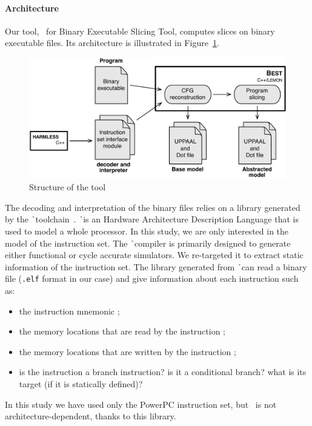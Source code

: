   \paragraph*{Architecture}{
    Our tool, \best\ for Binary Executable Slicing Tool, computes slices on
    binary executable files. 
    Its architecture is illustrated in Figure~\ref{fig:implem}.
    
  \begin{figure}[ht]
    \centering
    \includegraphics[scale=.5]{fig/workflow.pdf}
    \caption{Structure of the tool}
    \label{fig:implem}
  \end{figure}

    The decoding and interpretation of the binary files relies on a library
    generated by the \h\ toolchain~\cite{KBB12}. \h\ is an Hardware Architecture
    Description Language that is used to model a whole processor. In this study,
    we are only interested in the model of the instruction set. The \h\ compiler
    is primarily designed to generate either functional or cycle accurate
    simulators. We re-targeted it to extract static information of the
    instruction set. The library generated from \h\ can read a binary file
    (\texttt{.elf} format in our case) and give information about each
    instruction such as:
    \begin{itemize}
      \item the instruction mnemonic ;
      \item the memory locations that are read by the instruction ;
      \item the memory locations that are written by the instruction ;
      \item is the instruction a branch instruction? is it a conditional branch?
        what is its target (if it is statically defined)?
    \end{itemize}
    In this study we have used only the PowerPC instruction set, but
    \best\ is not architecture-dependent, thanks to this library.
    
}
